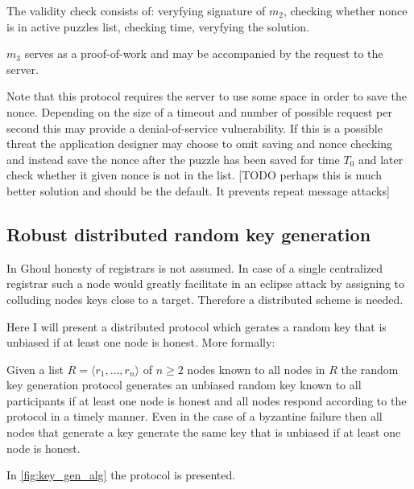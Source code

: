 The validity check consists of: veryfying signature of $m_2$, checking whether
nonce is in active puzzles list, checking time, veryfying the solution.

$m_3$ serves as a proof-of-work and may be accompanied by the request to the
server.

Note that this protocol requires the server to use some space in order to save
the nonce. Depending on the size of a timeout and number of possible request per
second this may provide a denial-of-service vulnerability. If this is a possible
threat the application designer may choose to omit saving and nonce checking and
instead save the nonce after the puzzle has been saved for time $T_0$ and later
check whether it given nonce is not in the list. [TODO perhaps this is much
better solution and should be the default. It prevents repeat message attacks]

\subsection{Robust distributed random key generation}

In Ghoul honesty of registrars is not assumed. In case of a single centralized
registrar such a node would greatly facilitate in an eclipse attack by
assigning to colluding nodes keys close to a target. Therefore a distributed
scheme is needed.

Here  I will present a distributed protocol which gerates a random key that is
unbiased if at least one node is honest. More formally:

\begin{theorem}
  Given a list $R = \langle r_1, \ldots, r_n \rangle$ of $n \geq 2$ nodes known
  to all nodes in $R$ the random key generation protocol generates an unbiased
  random key known to all participants if at least one node is honest and all
  nodes respond according to the protocol in a timely manner. Even in the case
  of a byzantine failure then all nodes that generate a key generate the same
  key that is unbiased if at least one node is honest.
\end{theorem}

In \ref{fig:key_gen_alg} the protocol is presented.

